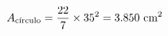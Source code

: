 \documentclass[preview]{standalone}
\begin{document}
\begin{align*}
\special{dvisvgm:raw <g id='unique000'>}A_{\text{círculo}} = \frac{22}{7} \times 35^2 = 3.850\text{ cm}^2\\\special{dvisvgm:raw </g>}
\end{align*}
\end{document}
